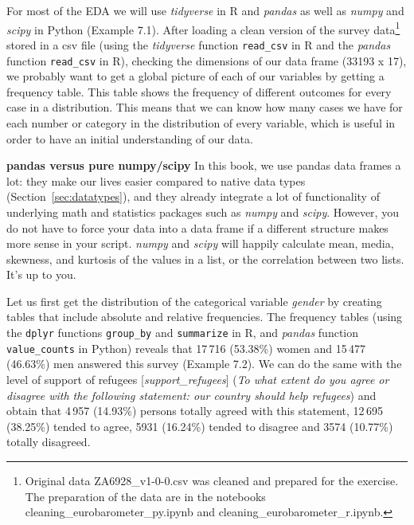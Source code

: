 For most of the EDA we will use \emph{tidyverse} in R and \emph{pandas} as well as \emph{numpy} and \emph{scipy} in Python (Example 7.1). After loading a clean version of the survey data\footnote{Original data ZA6928\_v1-0-0.csv was cleaned and prepared for the exercise. The preparation of the data are in the notebooks cleaning\_eurobarometer\_py.ipynb and cleaning\_eurobarometer\_r.ipynb.}  stored in a csv file (using the \emph{tidyverse} function \texttt{read\_csv} in R and the \emph{pandas} function \texttt{read\_csv} in R), checking the dimensions of our data frame (33193 x 17), we probably want to get a global picture of each of our variables by getting a frequency table. This table shows the frequency of different outcomes for every case in a distribution. This means that we can know how many cases we have for each number or category in the distribution of every variable, which is useful in order to have an initial understanding of our data.

\begin{feature}
  \textbf{pandas versus pure numpy/scipy} In this book, we use pandas
  data frames a lot: they make our lives easier compared to native
  data types (Section~\ref{sec:datatypes}), and they already integrate a lot of
  functionality of underlying math and statistics packages such as
  \emph{numpy} and \emph{scipy}. However, you do not have to force your
  data into a data frame if a different structure makes more sense in
  your script. \emph{numpy} and \emph{scipy} will happily calculate
  mean, media, skewness, and kurtosis of the values in a list, or the
  correlation between two lists. It's up to you.
\end{feature}


		
Let us first get the distribution of the categorical variable \textit{gender} by creating tables that include absolute and relative frequencies. The frequency tables (using the \texttt{dplyr} functions \texttt{group\_by} and \texttt{summarize} in R, and \emph{pandas} function \texttt{value\_counts} in Python) reveals that 17\,716 (53.38\%) women and 15\,477 (46.63\%) men answered this survey (Example 7.2). We can do the same with the level of support of refugees [\textit{support\_refugees}] (\textit{To what extent do you agree or disagree with the following statement: our country should help refugees}) and obtain that 4\,957 (14.93\%) persons totally agreed with this statement, 12\,695 (38.25\%) tended to agree, 5931 (16.24\%) tended to disagree and 3574 (10.77\%) totally disagreed.

